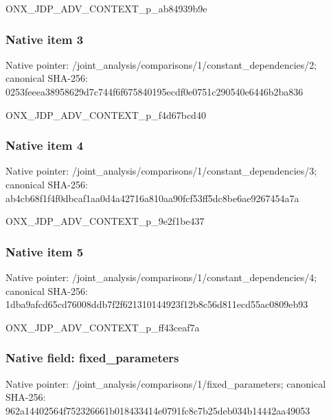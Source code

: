 \documentclass[10pt,a4paper]{article}
\begin{document}
\begingroup\raggedright\sloppy ONX\_\allowbreak{}JDP\_\allowbreak{}ADV\_\allowbreak{}CONTEXT\_\allowbreak{}p\_\allowbreak{}ab84939b9e\par\endgroup

\subsubsection{Native item 3}
Native pointer: /joint\_\allowbreak{}analysis/comparisons/1/constant\_\allowbreak{}dependencies/2; canonical SHA-256: 0253feeea38958629d7c744f6f675840195ecdf0e0751c290540e6446b2ba836

\begingroup\raggedright\sloppy ONX\_\allowbreak{}JDP\_\allowbreak{}ADV\_\allowbreak{}CONTEXT\_\allowbreak{}p\_\allowbreak{}f4d67bcd40\par\endgroup

\subsubsection{Native item 4}
Native pointer: /joint\_\allowbreak{}analysis/comparisons/1/constant\_\allowbreak{}dependencies/3; canonical SHA-256: ab4cb68f1f4f0dbcaf1aa0d4a42716a810aa90fcf53ff5dc8be6ae9267454a7a

\begingroup\raggedright\sloppy ONX\_\allowbreak{}JDP\_\allowbreak{}ADV\_\allowbreak{}CONTEXT\_\allowbreak{}p\_\allowbreak{}9e2f1be437\par\endgroup

\subsubsection{Native item 5}
Native pointer: /joint\_\allowbreak{}analysis/comparisons/1/constant\_\allowbreak{}dependencies/4; canonical SHA-256: 1dba9afcd65cd76008ddb7f2f621310144923f12b8c56d811ecd55ac0809eb93

\begingroup\raggedright\sloppy ONX\_\allowbreak{}JDP\_\allowbreak{}ADV\_\allowbreak{}CONTEXT\_\allowbreak{}p\_\allowbreak{}ff43ceaf7a\par\endgroup

\subsubsection{Native field: fixed\_\allowbreak{}parameters}
Native pointer: /joint\_\allowbreak{}analysis/comparisons/1/fixed\_\allowbreak{}parameters; canonical SHA-256: 962a14402564f752326661b018433414e0791fc8c7b25deb034b14442aa49053
\end{document}
